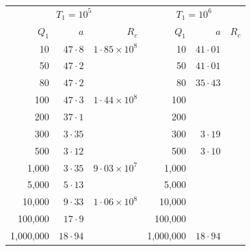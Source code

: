 \begin{table}[p]
\bigskip
\begin{tabular}{r@{\quad}r@{\quad}r|r@{\quad}r@{\quad}r}
\hline
\multicolumn{3}{c|}{$T_1 = 10^{5}$} & \multicolumn{3}{c}{$T_1 = 10^{6}$} \\
$Q_1$ & $a$ & $R_c$ & $Q_1$ & $a$ & $R_c$ \\
\hline
 10   & $47{\cdot}8$ & $1{\cdot}85\times10^{8}$ & 10   & $41{\cdot}01$ &           \\
 50   & $47{\cdot}2$ &                          & 50   & $41{\cdot}01$ &           \\
 80   & $47{\cdot}2$ &                          & 80   & $35{\cdot}43$ &           \\
 100  & $47{\cdot}3$ & $1{\cdot}44\times10^{8}$ & 100  &              &           \\
 200  & $37{\cdot}1$ &                          & 200  &              &           \\
 300  & $3{\cdot}35$ &                          & 300  & $3{\cdot}19$ &           \\
 500  & $3{\cdot}12$ &                          & 500  & $3{\cdot}10$ &           \\
 1{,}000 & $3{\cdot}35$ &$9{\cdot}03\times10^{7}$& 1{,}000 &            &          \\
 5{,}000 & $5{\cdot}13$ &                       & 5{,}000 &              &         \\
 10{,}000 & $9{\cdot}33$ &$1{\cdot}06\times10^{8}$& 10{,}000 &           &          \\
 100{,}000 & $17{\cdot}9$ &                     & 100{,}000 &             &          \\
 1{,}000{,}000 & $18{\cdot}94$ &                & 1{,}000{,}000 & $18{\cdot}94$ &   \\
\hline
\end{tabular}


\end{table}
